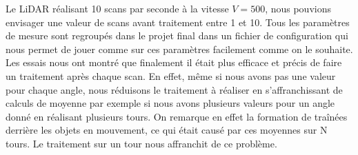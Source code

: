 \tab Le LiDAR réalisant 10  scans par seconde à la vitesse $V = 500 $, nous pouvions envisager une valeur de scans avant traitement entre 1 et 10. Tous les paramètres de mesure sont regroupés dans le projet final dans un fichier de configuration qui nous permet de jouer comme sur ces paramètres facilement comme on le souhaite. Les essais nous ont montré que finalement il était plus efficace et précis de faire un traitement après chaque scan. En effet, même si nous avons pas une valeur pour chaque angle, nous réduisons le traitement à réaliser en s'affranchissant de calculs de moyenne par exemple si nous avons plusieurs valeurs pour un angle donné en réalisant plusieurs tours. On remarque en effet la formation de traînées derrière les objets en mouvement, ce qui était causé par ces moyennes sur N tours. Le traitement sur un tour nous affranchit de ce problème.